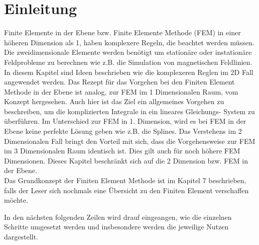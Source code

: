 %
%
%
\section{Einleitung\label{fem:section:einleitung}}
Finite Elemente in der Ebene bzw. Finite Elemente Methode (FEM) in einer höheren Dimension als 1, haben komplexere Regeln, die beachtet werden müssen. Die zweidimensionale Elemente werden benötigt um stationäre oder instationäre Feldprobleme zu berechnen wie z.B. die Simulation von magnetischen Feldlinien. In diesem Kapitel sind Ideen beschrieben wie die komplexeren Reglen im 2D Fall angewendet werden. Das Rezept für das Vorgehen bei den Finiten Element Methode in der Ebene ist analog, zur FEM im 1 Dimensionalen Raum, vom Konzept hergesehen. Auch hier ist das Ziel ein allgemeines Vorgehen zu beschreiben, um die komplizierten Integrale in ein lineares Gleichungs- System zu überführen. Im Unterschied zur FEM in 1. Dimension, wird es bei FEM in der Ebene keine perfekte Lösung geben wie z.B. die Splines. Das Verstehens im 2 Dimensionalen Fall bringt den Vorteil mit sich, dass die Vorgehensweise zur FEM im 3 Dimensionalen Raum identisch ist. Dies gilt auch für noch höhere FEM Dimensionen. Dieses  Kapitel beschränkt sich auf die 2 Dimension bzw. FEM in der Ebene. \\
Das Grundkonzept der Finiten Element Methode ist im Kapitel 7 beschrieben, falls der Leser sich nochmals eine Übersicht zu den Finiten Element verschaffen möchte.

In den nächsten folgenden Zeilen wird drauf eingeangen, wie die einzelnen Schritte umgesetzt werden und insbesondere werden die jeweilige Nutzen dargestellt.

